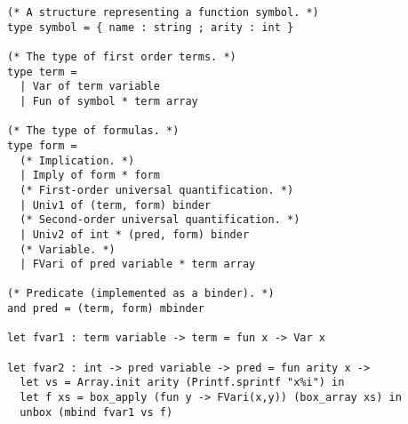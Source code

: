 \documentclass[11pt]{article}
\begin{document}
\begin{verbatim}
(* A structure representing a function symbol. *)
type symbol = { name : string ; arity : int }

(* The type of first order terms. *)
type term =
  | Var of term variable
  | Fun of symbol * term array

(* The type of formulas. *)
type form =
  (* Implication. *)
  | Imply of form * form
  (* First-order universal quantification. *)
  | Univ1 of (term, form) binder
  (* Second-order universal quantification. *)
  | Univ2 of int * (pred, form) binder
  (* Variable. *)
  | FVari of pred variable * term array

(* Predicate (implemented as a binder). *)
and pred = (term, form) mbinder

let fvar1 : term variable -> term = fun x -> Var x

let fvar2 : int -> pred variable -> pred = fun arity x ->
  let vs = Array.init arity (Printf.sprintf "x%i") in
  let f xs = box_apply (fun y -> FVari(x,y)) (box_array xs) in
  unbox (mbind fvar1 vs f)
\end{verbatim}
\end{document}
